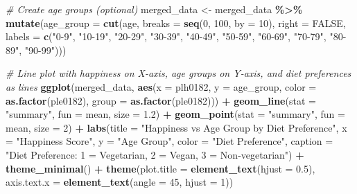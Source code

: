 \documentclass[
]{article}
\newenvironment{Shaded}{\begin{snugshade}}{\end{snugshade}}
\newcommand{\AttributeTok}[1]{\textcolor[rgb]{0.13,0.29,0.53}{#1}}
\newcommand{\CommentTok}[1]{\textcolor[rgb]{0.56,0.35,0.01}{\textit{#1}}}
\newcommand{\ConstantTok}[1]{\textcolor[rgb]{0.56,0.35,0.01}{#1}}
\newcommand{\DecValTok}[1]{\textcolor[rgb]{0.00,0.00,0.81}{#1}}
\newcommand{\FloatTok}[1]{\textcolor[rgb]{0.00,0.00,0.81}{#1}}
\newcommand{\FunctionTok}[1]{\textcolor[rgb]{0.13,0.29,0.53}{\textbf{#1}}}
\newcommand{\NormalTok}[1]{#1}
\newcommand{\OtherTok}[1]{\textcolor[rgb]{0.56,0.35,0.01}{#1}}
\newcommand{\SpecialCharTok}[1]{\textcolor[rgb]{0.81,0.36,0.00}{\textbf{#1}}}
\newcommand{\StringTok}[1]{\textcolor[rgb]{0.31,0.60,0.02}{#1}}
\begin{document}
\begin{Shaded}
\begin{Highlighting}[]
\CommentTok{\# Create age groups (optional)}
\NormalTok{merged\_data }\OtherTok{\textless{}{-}}\NormalTok{ merged\_data }\SpecialCharTok{\%\textgreater{}\%}
  \FunctionTok{mutate}\NormalTok{(}\AttributeTok{age\_group =} \FunctionTok{cut}\NormalTok{(age, }\AttributeTok{breaks =} \FunctionTok{seq}\NormalTok{(}\DecValTok{0}\NormalTok{, }\DecValTok{100}\NormalTok{, }\AttributeTok{by =} \DecValTok{10}\NormalTok{), }\AttributeTok{right =} \ConstantTok{FALSE}\NormalTok{, }\AttributeTok{labels =} \FunctionTok{c}\NormalTok{(}\StringTok{"0{-}9"}\NormalTok{, }\StringTok{"10{-}19"}\NormalTok{, }\StringTok{"20{-}29"}\NormalTok{, }\StringTok{"30{-}39"}\NormalTok{, }\StringTok{"40{-}49"}\NormalTok{, }\StringTok{"50{-}59"}\NormalTok{, }\StringTok{"60{-}69"}\NormalTok{, }\StringTok{"70{-}79"}\NormalTok{, }\StringTok{"80{-}89"}\NormalTok{, }\StringTok{"90{-}99"}\NormalTok{)))}

\CommentTok{\# Line plot with happiness on X{-}axis, age groups on Y{-}axis, and diet preferences as lines}
\FunctionTok{ggplot}\NormalTok{(merged\_data, }\FunctionTok{aes}\NormalTok{(}\AttributeTok{x =}\NormalTok{ plh0182, }\AttributeTok{y =}\NormalTok{ age\_group, }\AttributeTok{color =} \FunctionTok{as.factor}\NormalTok{(ple0182), }\AttributeTok{group =} \FunctionTok{as.factor}\NormalTok{(ple0182))) }\SpecialCharTok{+}
  \FunctionTok{geom\_line}\NormalTok{(}\AttributeTok{stat =} \StringTok{"summary"}\NormalTok{, }\AttributeTok{fun =}\NormalTok{ mean, }\AttributeTok{size =} \FloatTok{1.2}\NormalTok{) }\SpecialCharTok{+}
  \FunctionTok{geom\_point}\NormalTok{(}\AttributeTok{stat =} \StringTok{"summary"}\NormalTok{, }\AttributeTok{fun =}\NormalTok{ mean, }\AttributeTok{size =} \DecValTok{2}\NormalTok{) }\SpecialCharTok{+}
  \FunctionTok{labs}\NormalTok{(}\AttributeTok{title =} \StringTok{"Happiness vs Age Group by Diet Preference"}\NormalTok{,}
       \AttributeTok{x =} \StringTok{"Happiness Score"}\NormalTok{,}
       \AttributeTok{y =} \StringTok{"Age Group"}\NormalTok{,}
       \AttributeTok{color =} \StringTok{"Diet Preference"}\NormalTok{,}
       \AttributeTok{caption =} \StringTok{"Diet Preference: 1 = Vegetarian, 2 = Vegan, 3 = Non{-}vegetarian"}\NormalTok{) }\SpecialCharTok{+}
  \FunctionTok{theme\_minimal}\NormalTok{() }\SpecialCharTok{+}
  \FunctionTok{theme}\NormalTok{(}\AttributeTok{plot.title =} \FunctionTok{element\_text}\NormalTok{(}\AttributeTok{hjust =} \FloatTok{0.5}\NormalTok{),}
        \AttributeTok{axis.text.x =} \FunctionTok{element\_text}\NormalTok{(}\AttributeTok{angle =} \DecValTok{45}\NormalTok{, }\AttributeTok{hjust =} \DecValTok{1}\NormalTok{))}
\end{Highlighting}
\end{Shaded}
\end{document}
